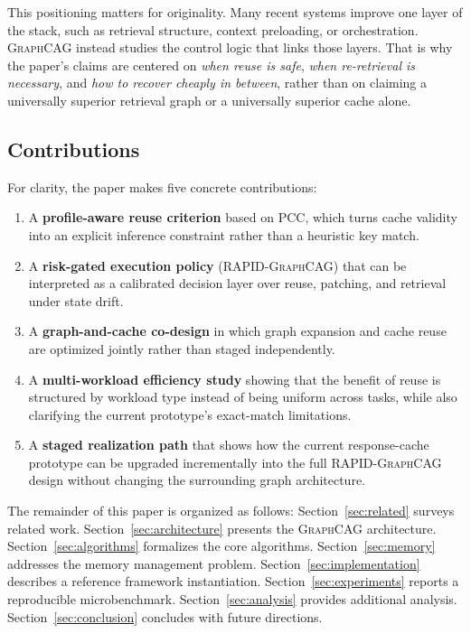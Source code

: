 \documentclass[11pt,a4paper,twocolumn]{article}
\newcommand{\graphcag}{\textsc{GraphCAG}}
\newcommand{\rapid}{\textsc{RAPID-GraphCAG}}
\begin{document}
This positioning matters for originality. Many recent systems improve one layer of the stack, such as retrieval structure, context preloading, or orchestration. \graphcag{} instead studies the control logic that links those layers. That is why the paper's claims are centered on \emph{when reuse is safe}, \emph{when re-retrieval is necessary}, and \emph{how to recover cheaply in between}, rather than on claiming a universally superior retrieval graph or a universally superior cache alone.

\subsection{Contributions}

For clarity, the paper makes five concrete contributions:
\begin{enumerate}[leftmargin=*]
  \item A \textbf{profile-aware reuse criterion} based on PCC, which turns cache validity into an explicit inference constraint rather than a heuristic key match.
  \item A \textbf{risk-gated execution policy} (\rapid{}) that can be interpreted as a calibrated decision layer over reuse, patching, and retrieval under state drift.
  \item A \textbf{graph-and-cache co-design} in which graph expansion and cache reuse are optimized jointly rather than staged independently.
  \item A \textbf{multi-workload efficiency study} showing that the benefit of reuse is structured by workload type instead of being uniform across tasks, while also clarifying the current prototype's exact-match limitations.
  \item A \textbf{staged realization path} that shows how the current response-cache prototype can be upgraded incrementally into the full \rapid{} design without changing the surrounding graph architecture.
\end{enumerate}

The remainder of this paper is organized as follows: Section~\ref{sec:related} surveys related work. Section~\ref{sec:architecture} presents the \graphcag{} architecture. Section~\ref{sec:algorithms} formalizes the core algorithms. Section~\ref{sec:memory} addresses the memory management problem. Section~\ref{sec:implementation} describes a reference framework instantiation. Section~\ref{sec:experiments} reports a reproducible microbenchmark. Section~\ref{sec:analysis} provides additional analysis. Section~\ref{sec:conclusion} concludes with future directions.
\end{document}
